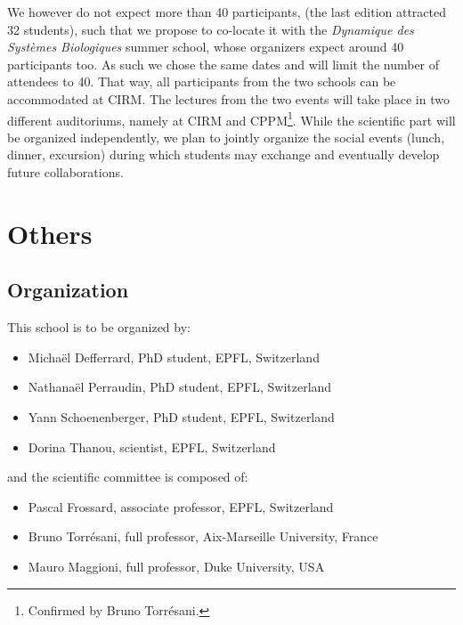 \documentclass[a4paper]{scrartcl}
\begin{document}
We however do not expect more than 40 participants, (the last edition attracted
32 students), such that we propose to co-locate it with the \textit{Dynamique des
Systèmes Biologiques} summer school, whose organizers expect around 40
participants too. As such we chose the same dates and will limit the number of
attendees to 40. That way, all participants from the two schools can be
accommodated at CIRM. The lectures from the two events will take place in two
different auditoriums, namely at CIRM and CPPM\footnote{Confirmed by Bruno
Torrésani.}. While the scientific part will be organized independently, we plan
to jointly organize the social events (lunch, dinner, excursion) during which
students may exchange and eventually develop future collaborations.

\section{Others}

\subsection{Organization}

This school is to be organized by:
\begin{itemize}
	\setlength{\itemsep}{0pt} \setlength{\parskip}{0pt}
	\item Michaël Defferrard, PhD student, EPFL, Switzerland
	\item Nathanaël Perraudin, PhD student, EPFL, Switzerland
	\item Yann Schoenenberger, PhD student, EPFL, Switzerland
	\item Dorina Thanou, scientist, EPFL, Switzerland
\end{itemize}
and the scientific committee is composed of:
\begin{itemize}
	\setlength{\itemsep}{0pt} \setlength{\parskip}{0pt}
	\item Pascal Frossard, associate professor, EPFL, Switzerland
	\item Bruno Torrésani, full professor, Aix-Marseille University, France
	\item Mauro Maggioni, full professor, Duke University, USA
\end{itemize}
\end{document}

